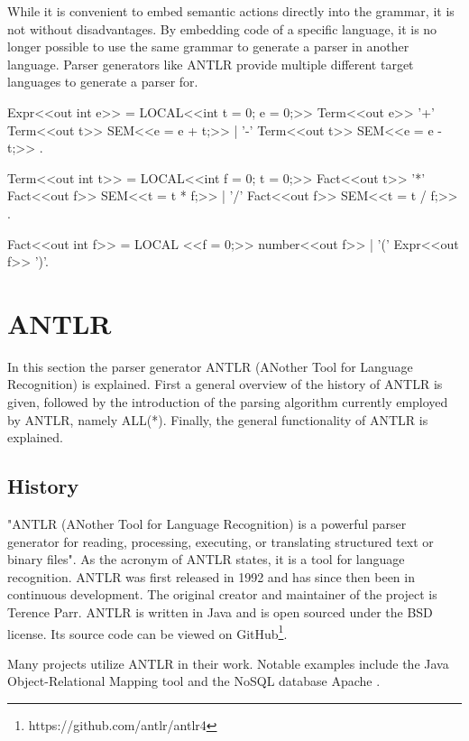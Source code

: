 While it is convenient to embed semantic actions directly into the grammar, it is not without disadvantages. By embedding code of a specific language, it is no longer possible to use the same grammar to generate a parser in another language. Parser generators like ANTLR provide multiple different target languages to generate a parser for. 

\begin{GenericCode}[float,numbers=none,caption=Attributed Grammar in Coco-2 for simple arithmetic expressions., label=lst:Coco2ATG]
Expr<<out int e>> =    LOCAL<<int t = 0; e = 0;>>
Term<<out e>>             
{ '+' Term<<out t>>    SEM<<e = e + t;>>
| '-' Term<<out t>>    SEM<<e = e - t;>>
}.

Term<<out int t>> =    LOCAL<<int f = 0; t = 0;>>
  Fact<<out t>>
  { '*' Fact<<out f>>  SEM<<t = t * f;>>
  | '/' Fact<<out f>>  SEM<<t = t / f;>>
  }.
  
Fact<<out int f>> =    LOCAL <<f = 0;>>
    number<<out f>>
  | '(' Expr<<out f>> ')'.

\end{GenericCode}

\section{ANTLR}

In this section the parser generator ANTLR (ANother Tool for Language Recognition) is explained. First a general overview of the history of ANTLR is given, followed by the introduction of the parsing algorithm currently employed by ANTLR, namely ALL(*). Finally, the general functionality of ANTLR is explained.  

\subsection{History}

"ANTLR (ANother Tool for Language Recognition) is a powerful parser generator for reading, processing, executing, or translating structured text or binary files". As the acronym of ANTLR states, it is a tool for language recognition. ANTLR was first released in 1992 and has since then been in continuous development. The original creator and maintainer of the project is Terence Parr. ANTLR is written in Java and is open sourced under the BSD license. Its source code can be viewed on GitHub\footnote{https://github.com/antlr/antlr4}. 

Many projects utilize ANTLR in their work. Notable examples include the Java Object-Relational Mapping tool \cite{HibernateWeb2024} and the NoSQL database Apache \textcite{Cassandra2024}.

